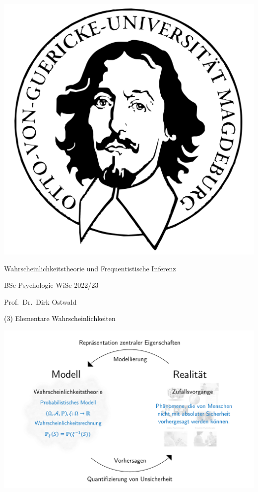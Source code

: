 \documentclass[
  8pt,
  ignorenonframetext,
]{beamer}
\author{}
\date{\vspace{-2.5em}}
\begin{document}
\begin{frame}[plain]{}
\protect\hypertarget{section}{}
\center

\begin{center}\includegraphics[width=0.2\linewidth]{3_Abbildungen/wtfi_3_otto} \end{center}

\vspace{2mm}

\Large

Wahrscheinlichkeitstheorie und Frequentistische Inferenz \vspace{6mm}

\large

BSc Psychologie WiSe 2022/23

\vspace{6mm}
\large

Prof.~Dr.~Dirk Ostwald
\end{frame}

\begin{frame}[plain]{}
\protect\hypertarget{section-1}{}
\vfill
\center
\huge

\textcolor{black}{(3) Elementare Wahrscheinlichkeiten} \vfill
\end{frame}

\begin{frame}{}
\protect\hypertarget{section-2}{}
\begin{center}\includegraphics[width=0.9\linewidth]{3_Abbildungen/wtfi_3_wahrscheinlichkeitstheorie_modell} \end{center}
\end{frame}
\end{document}
